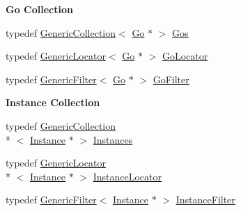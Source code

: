 \begin{Indent}{\bf Go Collection}\par
\begin{DoxyCompactItemize}
\item 
typedef \hyperlink{classHurricane_1_1GenericCollection}{Generic\-Collection}$<$ \hyperlink{classHurricane_1_1Go}{Go} $\ast$ $>$ \hyperlink{namespaceHurricane_a4456a34f3bc6766d471c3064ace19759}{Gos}
\item 
typedef \hyperlink{classHurricane_1_1GenericLocator}{Generic\-Locator}$<$ \hyperlink{classHurricane_1_1Go}{Go} $\ast$ $>$ \hyperlink{namespaceHurricane_ab7d66a25194b15d7646c93bcc1b15fc8}{Go\-Locator}
\item 
typedef \hyperlink{classHurricane_1_1GenericFilter}{Generic\-Filter}$<$ \hyperlink{classHurricane_1_1Go}{Go} $\ast$ $>$ \hyperlink{namespaceHurricane_a372aada7b76742fd900d0bb2c5398e0c}{Go\-Filter}
\end{DoxyCompactItemize}
\end{Indent}
\begin{Indent}{\bf Instance Collection}\par
\begin{DoxyCompactItemize}
\item 
typedef \hyperlink{classHurricane_1_1GenericCollection}{Generic\-Collection}\\*
$<$ \hyperlink{classHurricane_1_1Instance}{Instance} $\ast$ $>$ \hyperlink{namespaceHurricane_ac9436b03a2926f34ad6863deae2baadc}{Instances}
\item 
typedef \hyperlink{classHurricane_1_1GenericLocator}{Generic\-Locator}\\*
$<$ \hyperlink{classHurricane_1_1Instance}{Instance} $\ast$ $>$ \hyperlink{namespaceHurricane_af4f7fa4dc3a2d3bdcec6f375dc5a21bc}{Instance\-Locator}
\item 
typedef \hyperlink{classHurricane_1_1GenericFilter}{Generic\-Filter}$<$ \hyperlink{classHurricane_1_1Instance}{Instance} $\ast$ $>$ \hyperlink{namespaceHurricane_a889ec1441e1876d9addf89dfab32e772}{Instance\-Filter}
\end{DoxyCompactItemize}
\end{Indent}
